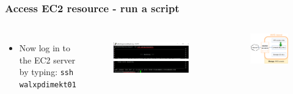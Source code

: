 \documentclass[aspectratio=169]{beamer} %
\newcommand{\ectwoName}{walxpdimekt01}
\begin{document}
\begin{frame}
	\frametitle{Access EC2 resource - run a script}
	\begin{columns}[c]
		\begin{itemize}
			\item Now log in to the EC2 server by typing: \newline
			\texttt{ssh \ectwoName}
		\end{itemize}

		\begin{figure}
			\centering
			\includegraphics[width=\textwidth]{./img/access-3a.png}
			\includegraphics[width=\textwidth]{./img/access-3b.png}
		\end{figure}

		\begin{figure}
			\centering
			\includegraphics[width=\textwidth]{./img/wb-aws-ec2.png}
		\end{figure}

	\end{columns}
\end{frame}
\end{document}
